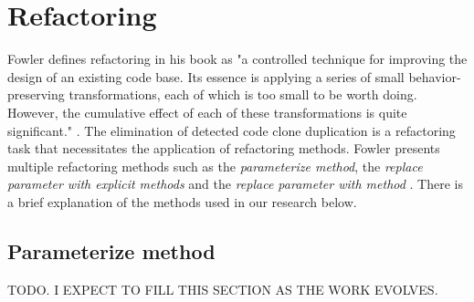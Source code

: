 \en

\section{Refactoring}

Fowler defines refactoring in his book as "a controlled technique for improving the design of an existing code base. 
Its essence is applying a series of small behavior-preserving transformations, each of which is too small to be worth 
doing. However, the cumulative effect of each of these transformations is quite significant." \citep{refactorbook}. 
The elimination of detected code clone duplication is a refactoring task that necessitates the 
application of refactoring methods. Fowler presents multiple refactoring methods such as the 
\textit{parameterize method}, the \textit{replace parameter with explicit methods} and 
the \textit{replace parameter with method} \citep{refactorbook}. 
There is a brief explanation of the methods used in our research below.

\subsection{Parameterize method}

TODO. I EXPECT TO FILL THIS SECTION AS THE WORK EVOLVES.
